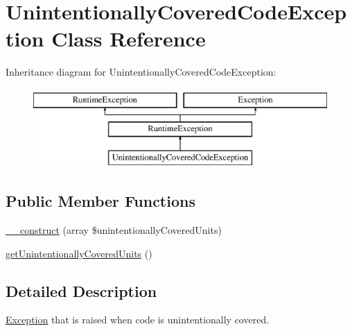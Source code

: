 \hypertarget{class_sebastian_bergmann_1_1_code_coverage_1_1_unintentionally_covered_code_exception}{}\section{Unintentionally\+Covered\+Code\+Exception Class Reference}
\label{class_sebastian_bergmann_1_1_code_coverage_1_1_unintentionally_covered_code_exception}
Inheritance diagram for Unintentionally\+Covered\+Code\+Exception\+:\begin{figure}[H]
\begin{center}
\leavevmode
\includegraphics[height=3.000000cm]{class_sebastian_bergmann_1_1_code_coverage_1_1_unintentionally_covered_code_exception}
\end{center}
\end{figure}
\subsection*{Public Member Functions}
\begin{DoxyCompactItemize}
\item 
\mbox{\hyperlink{class_sebastian_bergmann_1_1_code_coverage_1_1_unintentionally_covered_code_exception_ac4e49a2df3d66d8c52d8d45922d7a97f}{\+\_\+\+\_\+construct}} (array \$unintentionally\+Covered\+Units)
\item 
\mbox{\hyperlink{class_sebastian_bergmann_1_1_code_coverage_1_1_unintentionally_covered_code_exception_a16a718d842dd99bbb2e1dca90e05124a}{get\+Unintentionally\+Covered\+Units}} ()
\end{DoxyCompactItemize}


\subsection{Detailed Description}
\mbox{\hyperlink{interface_sebastian_bergmann_1_1_code_coverage_1_1_exception}{Exception}} that is raised when code is unintentionally covered. 

